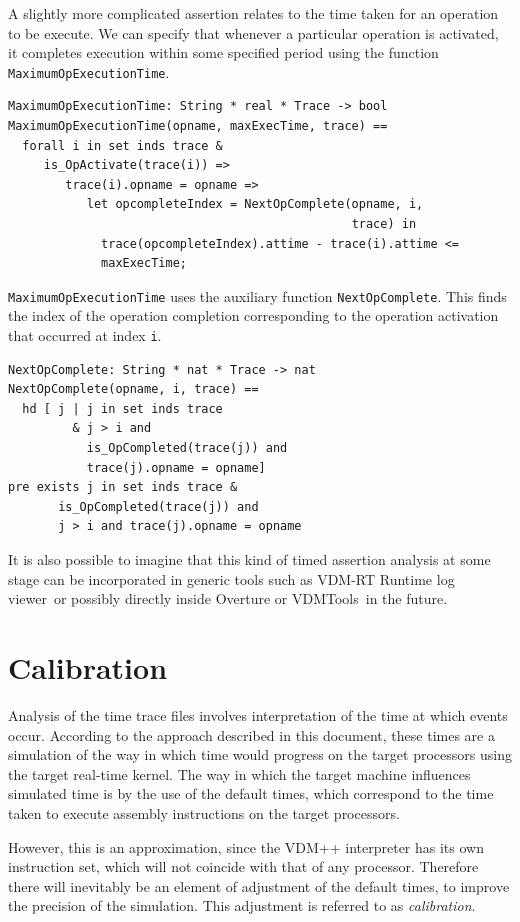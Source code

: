 \documentclass{overturerepchap}
\newcommand{\vdmtools}{VDMTools}
\newcommand{\showtrace}{VDM-RT Runtime log viewer}
\begin{document}
A slightly more complicated assertion relates to the time taken for an
operation to be execute. We can specify that whenever a particular
operation is activated, it completes execution within some specified
period using the function \texttt{MaximumOpExecutionTime}.

\begin{lstlisting}
MaximumOpExecutionTime: String * real * Trace -> bool
MaximumOpExecutionTime(opname, maxExecTime, trace) ==
  forall i in set inds trace &
     is_OpActivate(trace(i)) =>
        trace(i).opname = opname =>
           let opcompleteIndex = NextOpComplete(opname, i,
                                                trace) in
             trace(opcompleteIndex).attime - trace(i).attime <= 
             maxExecTime;
\end{lstlisting}

\texttt{MaximumOpExecutionTime} uses the auxiliary function
\texttt{NextOpComplete}. This finds the index of the operation
completion corresponding to the operation activation that occurred at
index \texttt{i}.

\begin{lstlisting}
NextOpComplete: String * nat * Trace -> nat
NextOpComplete(opname, i, trace) ==
  hd [ j | j in set inds trace
         & j > i and
           is_OpCompleted(trace(j)) and 
           trace(j).opname = opname]
pre exists j in set inds trace & 
       is_OpCompleted(trace(j)) and
       j > i and trace(j).opname = opname
\end{lstlisting}

It is also possible to imagine that this kind of timed assertion analysis 
at some stage can be incorporated in generic tools such as 
\showtrace\ or possibly directly inside Overture or \vdmtools\ in the future.

\section{Calibration}

Analysis of the time trace files involves interpretation of the time
at which events occur.  According to the approach described in this
document, these times are a simulation of the way in which time would
progress on the target processors using the target real-time kernel. The
way in which the target machine influences simulated time is by the use
of the default times, which correspond to the time taken to execute
assembly instructions on the target processors.

However, this is an approximation, since the VDM++ interpreter has its
own instruction set, which will not coincide with that of any
processor. Therefore there will inevitably be an element of adjustment
of the default times, to improve the precision of the simulation. This
adjustment is referred to as \emph{calibration}.
\end{document}

